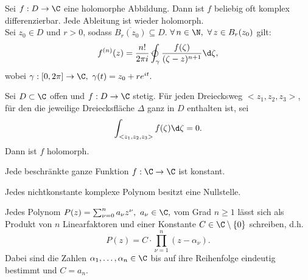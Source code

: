 \lecture\addtocounter{thm}{2}
		\begin{thmn}\label{2.3.6}
			Sei $ f: D \to \C $ eine holomorphe Abbildung. Dann ist $f$ beliebig oft komplex differenzierbar. Jede Ableitung ist wieder holomorph.\\
			Sei $ z_0 \in D $ und $r>0$, sodass $ \overbar{B_r(z_0)} \subseteq D $. $ \forall\,n \in \N,\ \forall\, z \in B_r(z_0) $ gilt:
			\[ f^{(n)}(z) = \frac{n!}{2 \pi i} \varointctrclockwise_\gamma \frac{f(\zeta)}{(\zeta-z)^{n+1}} \d \zeta, \]
			wobei $ \gamma: [0,2\pi] \to \C,\ \gamma(t) = z_0 + re^{it}. $
		\end{thmn}
		
		\begin{thmn}
			Sei $ D \subset \C $ offen und $f: D \to \C$ stetig. Für jeden Dreiecksweg $ <z_1,z_2,z_3> $, für den die jeweilige Dreiecksfläche $\Delta$ ganz in $D$ enthalten ist, sei
			\[ \int_{<z_1,z_2,z_3>} f(\zeta) \d\zeta = 0. \]
			Dann ist $f$ holomorph.
		\end{thmn}
		
		\begin{thmn}
			Jede beschränkte ganze Funktion $f: \C \to \C$ ist konstant.
		\end{thmn}
		
		\begin{thmn}
			Jedes nichtkonstante komplexe Polynom besitzt eine Nullstelle.
		\end{thmn}
	
		\begin{cor}
			Jedes Polynom $ P(z) = \sum_{\nu=0}^{n} a_\nu z^\nu,\ a_\nu \in \C, $ vom Grad $ n \geq 1 $ lässt sich als Produkt von $n$ Linearfaktoren und einer Konstante $ C \in \C \setminus \{0\} $ schreiben, d.h. 
			$$ P(z) = C \cdot \prod_{\nu = 1}^n (z-\alpha_\nu). $$
			Dabei sind die Zahlen $ \alpha_1,\dotsc,\alpha_n \in \C $ bis auf ihre Reihenfolge eindeutig bestimmt und $ C = a_n. $
		\end{cor}